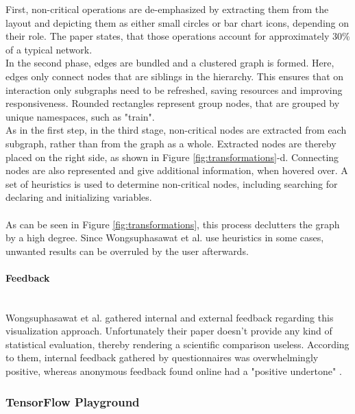 \documentclass{acmsiggraph}               %
\newcommand{\paragraphbr}[1]{\paragraph{#1}\mbox{}\\}
\begin{document}
First, non-critical operations are de-emphasized by extracting them from the layout and depicting them as either small circles or bar chart icons, depending on their role. The paper states, that those operations account for approximately 30\% of a typical network.\\
In the second phase, edges are bundled and a clustered graph is formed. Here, edges only connect nodes that are siblings in the hierarchy. This ensures that on interaction only subgraphs need to be refreshed, saving resources and improving responsiveness. Rounded rectangles represent group nodes, that are grouped by unique namespaces, such as "train".\\
As in the first step, in the third stage, non-critical nodes are extracted from each subgraph, rather than from the graph as a whole. Extracted nodes are thereby placed on the right side, as shown in Figure \ref{fig:transformations}-d. Connecting nodes are also represented and give additional information, when hovered over. A set of heuristics is used to determine non-critical nodes, including searching for declaring and initializing variables.\\\\
As can be seen in Figure \ref{fig:transformations}, this process declutters the graph by a high degree. Since Wongsuphasawat et al. use heuristics in some cases, unwanted results can be overruled by the user afterwards.

\paragraphbr{Feedback}

Wongsuphasawat et al. gathered internal and external feedback regarding this visualization approach. Unfortunately their paper doesn't provide any kind of statistical evaluation, thereby rendering a scientific comparison useless. According to them, internal feedback gathered by questionnaires was overwhelmingly positive, whereas anonymous feedback found online had a "positive undertone" \cite[p.~9]{Wongsuphasawat2018}.

\subsubsection{TensorFlow Playground}
\end{document}
